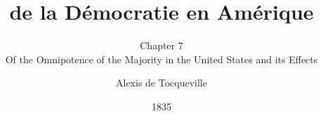 \documentclass[twoside,notitlepage,12pt,appendixprefix=true]{scrartcl}
\begin{document}
    \author{Alexis de Tocqueville}
    \date{1835}

    \title{de la Démocratie en Amérique}
    \subtitle{Chapter 7\\Of the Omnipotence of the Majority in the United States and its Effects}
    \maketitle

    
    \FloatBarrier
    \printbibliography
\end{document}
